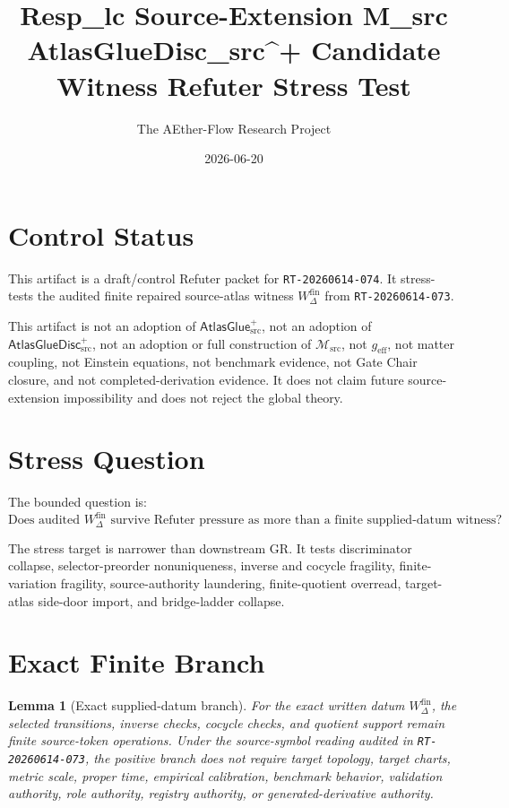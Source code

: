 \documentclass[11pt]{article}
\title{Resp\_lc Source-Extension M\_src AtlasGlueDisc\_src\^{}+ Candidate Witness Refuter Stress Test}
\author{The AEther-Flow Research Project}
\date{2026-06-20}
\newcommand{\Msrc}{\mathcal{M}_{\mathrm{src}}}
\newcommand{\geff}{g_{\mathrm{eff}}}
\newcommand{\AtlasGlue}{\mathsf{AtlasGlue}_{\mathrm{src}}^{+}}
\newcommand{\AtlasGlueDisc}{\mathsf{AtlasGlueDisc}_{\mathrm{src}}^{+}}
\newcommand{\Wfin}{W_{\Delta}^{\mathrm{fin}}}
\newtheorem{lemma}{Lemma}
\begin{document}
\maketitle

\section*{Control Status}

This artifact is a draft/control Refuter packet for
\texttt{RT-20260614-074}. It stress-tests the audited finite repaired
source-atlas witness \(\Wfin\) from \texttt{RT-20260614-073}.

This artifact is not an adoption of \(\AtlasGlue\), not an adoption of
\(\AtlasGlueDisc\), not an adoption or full construction of \(\Msrc\), not
\(\geff\), not matter coupling, not Einstein equations, not benchmark
evidence, not Gate Chair closure, and not completed-derivation evidence. It
does not claim future source-extension impossibility and does not reject the
global theory.

\section{Stress Question}

The bounded question is:
\[
\text{Does audited }\Wfin\text{ survive Refuter pressure as more than a
finite supplied-datum witness?}
\]

The stress target is narrower than downstream GR. It tests discriminator
collapse, selector-preorder nonuniqueness, inverse and cocycle fragility,
finite-variation fragility, source-authority laundering, finite-quotient
overread, target-atlas side-door import, and bridge-ladder collapse.

\section{Exact Finite Branch}

\begin{lemma}[Exact supplied-datum branch]
For the exact written datum \(\Wfin\), the selected transitions, inverse
checks, cocycle checks, and quotient support remain finite source-token
operations. Under the source-symbol reading audited in
\texttt{RT-20260614-073}, the positive branch does not require target
topology, target charts, metric scale, proper time, empirical calibration,
benchmark behavior, validation authority, role authority, registry authority,
or generated-derivative authority.
\end{lemma}
\end{document}
